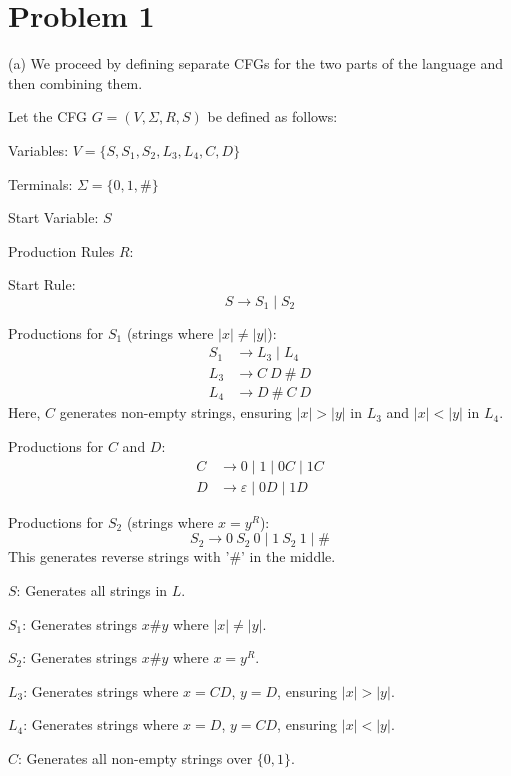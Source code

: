 \documentclass[12 pt]{article}
\begin{document}
\section*{Problem 1}

(a) We proceed by defining separate CFGs for the two parts of the language and then combining them.


Let the CFG \( G = (V, \Sigma, R, S) \) be defined as follows:

Variables: \( V = \{ S, S_1, S_2, L_3, L_4, C, D \} \)


Terminals: \( \Sigma = \{ 0, 1, \# \} \)


Start Variable: \( S \)


Production Rules \( R \):

Start Rule:
   \[
   S \rightarrow S_1 \mid S_2
   \]

Productions for \( S_1 \) (strings where \(|x| \ne |y|\)):
   \[
   \begin{aligned}
   S_1 &\rightarrow L_3 \mid L_4 \\
   L_3 &\rightarrow C\ D\ \#\ D \\
   L_4 &\rightarrow D\ \#\ C\ D
   \end{aligned}
   \]
   Here, \( C \) generates non-empty strings, ensuring \( |x| > |y| \) in \( L_3 \) and \( |x| < |y| \) in \( L_4 \).

Productions for \( C \) and \( D \):
   \[
   \begin{aligned}
   C &\rightarrow 0 \mid 1 \mid 0C \mid 1C \\
   D &\rightarrow \varepsilon \mid 0D \mid 1D
   \end{aligned}
   \]

Productions for \( S_2 \) (strings where \( x = y^R \)):
   \[
   S_2 \rightarrow 0\ S_2\ 0 \mid 1\ S_2\ 1 \mid \#
   \]
   This generates reverse strings with '\#' in the middle.


\( S \): Generates all strings in \( L \).


\( S_1 \): Generates strings \( x\#y \) where \( |x| \ne |y| \).


\( S_2 \): Generates strings \( x\#y \) where \( x = y^R \).


\( L_3 \): Generates strings where \( x = CD \), \( y = D \), ensuring \( |x| > |y| \).


\( L_4 \): Generates strings where \( x = D \), \( y = CD \), ensuring \( |x| < |y| \).


\( C \): Generates all non-empty strings over \( \{0, 1\} \).
\end{document}
